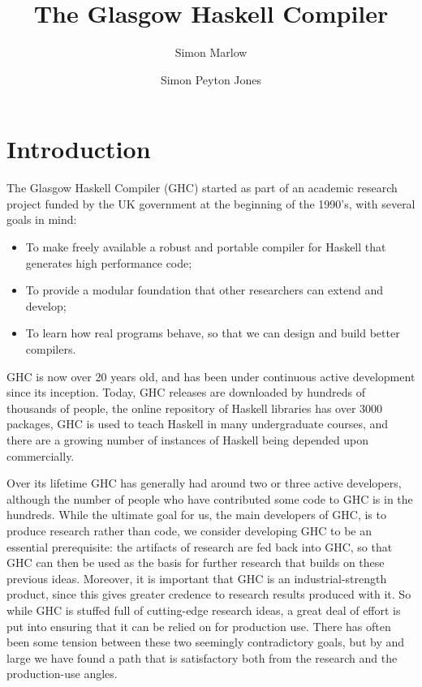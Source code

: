 \documentclass{article}
\title{The Glasgow Haskell Compiler}
\author{Simon Marlow \and Simon Peyton Jones}
\begin{document}
\newcommand{\draft}[1]{}

\newcommand{\Core}[0]{{\tt Core}}
\newcommand{\Lint}[0]{{\tt CoreLint}}

\newcommand{\SDM}[1]{\draft{\textit{\textcolor{blue}{SDM: #1}}}}
\newcommand{\SPJ}[1]{\draft{\textit{\textcolor{red}{SDM: #1}}}}

\maketitle


\makeatactive
\section{Introduction}

The Glasgow Haskell Compiler (GHC) started as part of an academic research
project funded by the UK government at the beginning of the 1990's,
with several goals in mind:

\begin{itemize}

\item To make freely available a robust and portable compiler for
    Haskell that generates high performance code;

\item To provide a modular foundation that other researchers can
  extend and develop;

\item To learn how real programs behave, so that we can design and
  build better compilers.

\end{itemize}

GHC is now over 20 years old, and has been under continuous active
development since its inception.  Today, GHC releases are downloaded
by hundreds of thousands of people, the online repository of Haskell
libraries has over 3000 packages, GHC is used to teach Haskell in
many undergraduate courses, and there are a growing number of
instances of Haskell being depended upon commercially.

Over its lifetime GHC has generally had around two or three active
developers, although the number of people who have contributed some
code to GHC is in the hundreds.  While the ultimate goal for us, the
main developers of GHC, is to produce research rather than code, we
consider developing GHC to be an essential prerequisite: the artifacts
of research are fed back into GHC, so that GHC can then be used as the
basis for further research that builds on these previous ideas.
Moreover, it is important that GHC is an industrial-strength product,
since this gives greater credence to research results produced with
it.  So while GHC is stuffed full of cutting-edge research ideas, a
great deal of effort is put into ensuring that it can be relied on for
production use.  There has often been some tension between these two
seemingly contradictory goals, but by and large we have found a path
that is satisfactory both from the research and the production-use
angles.
\end{document}
